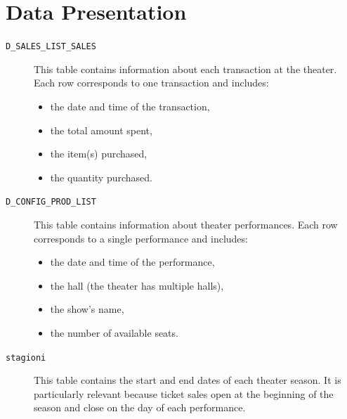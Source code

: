 \documentclass{Configuration_Files/PoliMi3i_thesis}
\begin{document}
\section{Data Presentation}
\begin{description}
    \item[\texttt{D\_SALES\_LIST\_SALES}] 
        This table contains information about each transaction at the theater. 
        Each row corresponds to one transaction and includes:
        \begin{itemize}
          \item the date and time of the transaction,
          \item the total amount spent,
          \item the item(s) purchased,
          \item the quantity purchased.
        \end{itemize}
        
  \item[\texttt{D\_CONFIG\_PROD\_LIST}] 
    This table contains information about theater performances. 
    Each row corresponds to a single performance and includes:
    \begin{itemize}
      \item the date and time of the performance,
      \item the hall (the theater has multiple halls),
      \item the show’s name,
      \item the number of available seats.
    \end{itemize}

  \item[\texttt{stagioni}] 
    This table contains the start and end dates of each theater season. 
    It is particularly relevant because ticket sales open at the beginning of the season and close on the day of each performance.
\end{description}
\end{document}
